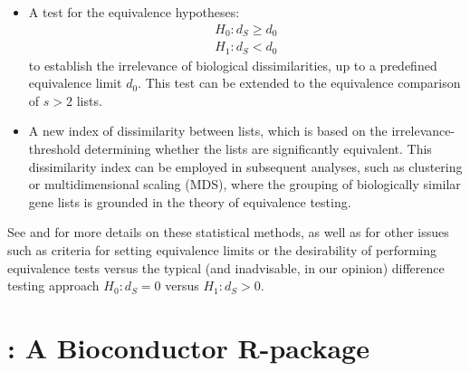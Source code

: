 \begin{itemize}
\item
  A test for the equivalence hypotheses:
  \begin{equation*}
  \begin{split}
  H_0: d_S \ge d_0 \\
  H_1: d_S < d_0
  \end{split}
  \end{equation*}
  to establish the irrelevance of biological dissimilarities, up to a predefined equivalence limit \(d_0\). This test can be extended to the equivalence comparison of \(s > 2\) lists.
\item
  A new index of dissimilarity between lists, which is based on the irrelevance-threshold determining whether the lists are significantly equivalent. This dissimilarity index can be employed in subsequent analyses, such as clustering or multidimensional scaling (MDS), where the grouping of biologically similar gene lists is grounded in the theory of equivalence testing.
\end{itemize}

See \citep{flores2022equivalence} and \citep{phdThesisPabloFlores} for more details on these statistical methods, as well as for other issues such as criteria for setting equivalence limits or the desirability of performing equivalence tests \citep{wellek2002testing} versus the typical (and inadvisable, in our opinion) difference testing approach \(H_0: d_S=0\) versus \(H_1:d_S>0\).

\section{\texorpdfstring{: A Bioconductor R-package}{: A Bioconductor R-package}}\label{a-bioconductor-r-package}

